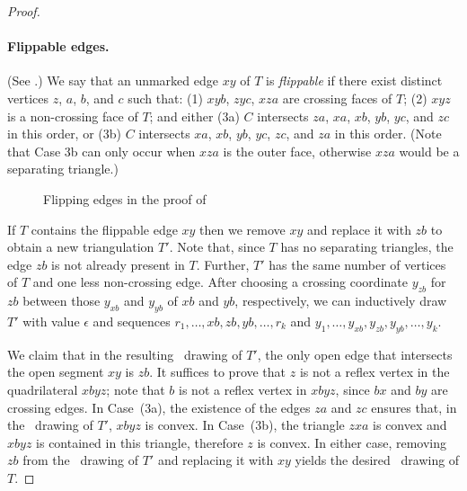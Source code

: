 \begin{proof}
	
	\paragraph{Flippable edges.}
	(See .)
	We say that an unmarked edge $xy$ of $T$ is \emph{flippable} if there
	exist distinct vertices $z$, $a$, $b$, and $c$ such that: (1) $xyb$, $zyc$, $xza$ are crossing faces of $T$; (2) $xyz$ is a non-crossing face of $T$; and either (3a) $C$ intersects $za$, $xa$, $xb$, $yb$, $yc$, and $zc$ in this order, or (3b) $C$ intersects $xa$, $xb$, $yb$, $yc$, $zc$, and $za$ in this order. (Note that Case 3b can only occur when $xza$ is the outer face, otherwise $xza$ would be a separating triangle.)  
	\begin{figure}
		\caption{Flipping edges in the proof of
			}
	\end{figure}
	
	If $T$ contains the flippable edge $xy$ then we remove $xy$ and replace it with $zb$ to obtain a new triangulation $T'$. Note that, since $T$ has no separating triangles, the edge $zb$ is not already present in $T$. Further, $T'$ has the same number of vertices of $T$ and one less non-crossing edge. After choosing a crossing coordinate $y_{zb}$ for $zb$ between those $y_{xb}$ and $y_{yb}$ of $xb$ and $yb$, respectively, we can inductively draw $T'$ with value $\epsilon$ and sequences $r_1,\dots,xb,zb,yb,\dots,r_k$ and $y_1,\dots,y_{xb},y_{zb},y_{yb},\dots,y_k$.
	
	We claim that in the resulting \Fary\ drawing of $T'$, the only open edge
	that intersects the open segment $xy$ is $zb$. It suffices to prove that $z$ is not a reflex vertex in the quadrilateral $xbyz$; note that $b$ is not a reflex vertex in $xbyz$, since $bx$ and $by$ are crossing edges. In Case~(3a), the existence of the
	edges $za$ and $zc$ ensures that, in the \Fary\ drawing of $T'$,
	$xbyz$ is convex. In Case~(3b), the triangle $zxa$ is convex and $xbyz$ is contained in this triangle, therefore $z$ is convex. In either case, removing $zb$ from the \Fary\ drawing of $T'$ and replacing it with $xy$ yields the desired \Fary\ drawing of $T$.
	

\end{proof}
